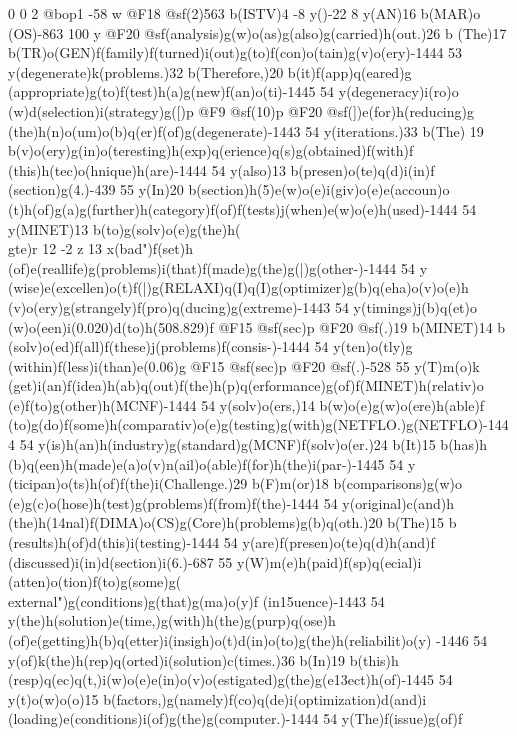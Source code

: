 {0 0 2 @bop1 -58 w @F18 @sf(2)563 b(ISTV)4 -8 y()-22 8 y(AN)16 b(MAR)o
(OS)-863 100 y @F20 @sf(analysis)g(w)o(as)g(also)g(carried)h(out.)26 b
(The)17 b(TR)o(GEN)f(family)f(turned)i(out)g(to)f(con)o(tain)g(v)o(ery)-1444 
53 y(degenerate)k(problems.)32 b(Therefore,)20 b(it)f(app)q(eared)g
(appropriate)g(to)f(test)h(a)g(new)f(an)o(ti{)-1445 54 y(degeneracy)i(ro)o
(w)d(selection)i(strategy)g([)p @F9 @sf(10)p @F20 @sf(])e(for)h(reducing)g
(the)h(n)o(um)o(b)q(er)f(of)g(degenerate)-1443 54 y(iterations.)33 b(The)
19 b(v)o(ery)g(in)o(teresting)h(exp)q(erience)q(s)g(obtained)f(with)f
(this)h(tec)o(hnique)h(are)-1444 54 y(also)13 b(presen)o(te)q(d)i(in)f
(section)g(4.)-439 55 y(In)20 b(section)h(5)e(w)o(e)i(giv)o(e)e(accoun)o
(t)h(of)g(a)g(further)h(category)f(of)f(tests)j(when)e(w)o(e)h(used)-1444 
54 y(MINET)13 b(to)g(solv)o(e)g(the)h(\\gte)r 12 -2 z 13 x(bad")f(set)h
(of)e(real{life)g(problems)i(that)f(made)g(the)g(|)g(other-)-1444 54 y
(wise)e(excellen)o(t)f(|)g(RELAX{I)q(I)q(I)g(optimizer)g(b)q(eha)o(v)o(e)h
(v)o(ery)g(strangely)f(pro)q(ducing)g(extreme)-1443 54 y(timings)j(b)q(et)o
(w)o(een)i(0.020)d(to)h(508.829)f @F15 @sf(sec)p @F20 @sf(.)19 b(MINET)14 b
(solv)o(ed)f(all)f(these)j(problems)f(consis-)-1444 54 y(ten)o(tly)g
(within)f(less)i(than)e(0.06)g @F15 @sf(sec)p @F20 @sf(.)-528 55 y(T)m(o)k
(get)i(an)f(idea)h(ab)q(out)f(the)h(p)q(erformance)g(of)f(MINET)h(relativ)o
(e)f(to)g(other)h(MCNF)-1444 54 y(solv)o(ers,)14 b(w)o(e)g(w)o(ere)h(able)f
(to)g(do)f(some)h(comparativ)o(e)g(testing)g(with)g(NETFLO.)g(NETFLO)-1444 
54 y(is)h(an)h(industry)g(standard)g(MCNF)f(solv)o(er.)24 b(It)15 b(has)h
(b)q(een)h(made)e(a)o(v)n(ail)o(able)f(for)h(the)i(par-)-1445 54 y
(ticipan)o(ts)h(of)f(the)i(Challenge.)29 b(F)m(or)18 b(comparisons)g(w)o
(e)g(c)o(hose)h(test)g(problems)f(from)f(the)-1444 54 y(original)c(and)h
(the)h(\014nal)f(DIMA)o(CS)g(Core)h(problems)g(b)q(oth.)20 b(The)15 b
(results)h(of)d(this)i(testing)-1444 54 y(are)f(presen)o(te)q(d)h(and)f
(discussed)i(in)d(section)i(6.)-687 55 y(W)m(e)h(paid)f(sp)q(ecial)i
(atten)o(tion)f(to)g(some)g(\\external")g(conditions)g(that)g(ma)o(y)f
(in\015uence)-1443 54 y(the)h(solution)e(time,)g(with)h(the)g(purp)q(ose)h
(of)e(getting)h(b)q(etter)i(insigh)o(t)d(in)o(to)g(the)h(reliabilit)o(y)
-1446 54 y(of)k(the)h(rep)q(orted)i(solution)c(times.)36 b(In)19 b(this)h
(resp)q(ec)q(t,)i(w)o(e)e(in)o(v)o(estigated)g(the)g(e\013ect)h(of)-1445 
54 y(t)o(w)o(o)15 b(factors,)g(namely)f(co)q(de)i(optimization)d(and)i
(loading)e(conditions)i(of)g(the)g(computer.)-1444 54 y(The)f(issue)g(of)f
}}}}
